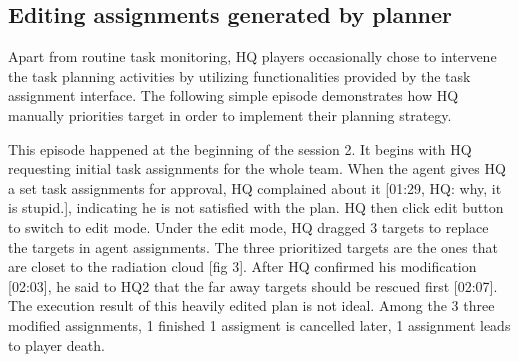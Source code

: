 \subsection{Editing assignments generated by planner}
Apart from routine task monitoring, HQ players occasionally chose to intervene the task planning activities by utilizing functionalities provided by the task assignment interface. The following simple episode demonstrates how HQ manually priorities target in order to implement their planning strategy. \\

\noindent{} 
\hfill \break


This episode happened at the beginning of the session 2. It begins with HQ requesting initial task assignments for the whole team. When the agent gives HQ  a set task assignments for approval, HQ complained about it [01:29, HQ: why, it is stupid.], indicating he is not satisfied with the plan. HQ then click edit button to switch to edit mode. Under the edit mode, HQ dragged 3 targets to replace the targets in agent assignments. The three prioritized targets are the ones that are closet to the radiation cloud [fig 3]. After HQ confirmed his modification [02:03], he said to HQ2 that the far away targets should be rescued first [02:07]. The execution result of this heavily edited plan is not ideal. Among the 3 three modified assignments, 1 finished 1 assigment is cancelled later, 1 assignment leads to player death.\\

